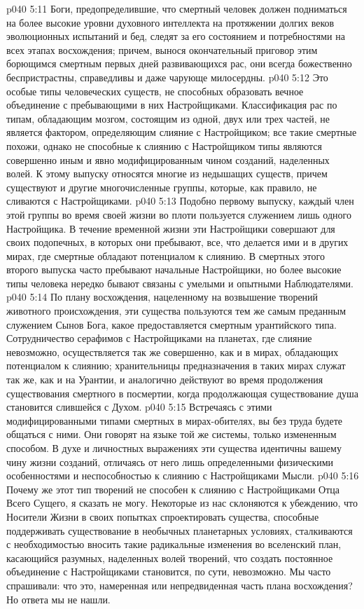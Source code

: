 \vs p040 5:11 \pc Боги, предопределившие, что смертный человек должен подниматься на более высокие уровни духовного интеллекта на протяжении долгих веков эволюционных испытаний и бед, следят за его состоянием и потребностями на всех этапах восхождения; причем, вынося окончательный приговор этим борющимся смертным первых дней развивающихся рас, они всегда божественно беспристрастны, справедливы и даже чарующе милосердны.
\vs p040 5:12 \pc {} Это особые типы человеческих существ, не способных образовать вечное объединение с пребывающими в них Настройщиками. Классификация рас по типам, обладающим мозгом, состоящим из одной, двух или трех частей, не является фактором, определяющим слияние с Настройщиком; все такие смертные похожи, однако не способные к слиянию с Настройщиком типы являются совершенно иным и явно модифицированным чином созданий, наделенных волей. К этому выпуску относятся многие из недышащих существ, причем существуют и другие многочисленные группы, которые, как правило, не сливаются с Настройщиками.
\vs p040 5:13 Подобно первому выпуску, каждый член этой группы во время своей жизни во плоти пользуется служением лишь одного Настройщика. В течение временной жизни эти Настройщики совершают для своих подопечных, в которых они пребывают, все, что делается ими и в других мирах, где смертные обладают потенциалом к слиянию. В смертных этого второго выпуска часто пребывают начальные Настройщики, но более высокие типы человека нередко бывают связаны с умелыми и опытными Наблюдателями.
\vs p040 5:14 По плану восхождения, нацеленному на возвышение творений животного происхождения, эти существа пользуются тем же самым преданным служением Сынов Бога, какое предоставляется смертным урантийского типа. Сотрудничество серафимов с Настройщиками на планетах, где слияние невозможно, осуществляется так же совершенно, как и в мирах, обладающих потенциалом к слиянию; хранительницы предназначения в таких мирах служат так же, как и на Урантии, и аналогично действуют во время продолжения существования смертного в посмертии, когда продолжающая существование душа становится слившейся с Духом.
\vs p040 5:15 Встречаясь с этими модифицированными типами смертных в мирах\hyp{}обителях, вы без труда будете общаться с ними. Они говорят на языке той же системы, только измененным способом. В духе и личностных выражениях эти существа идентичны вашему чину жизни созданий, отличаясь от него лишь определенными физическими особенностями и неспособностью к слиянию с Настройщиками Мысли.
\vs p040 5:16 Почему же этот тип творений не способен к слиянию с Настройщиками Отца Всего Сущего, я сказать не могу. Некоторые из нас склоняются к убеждению, что Носители Жизни в своих попытках спроектировать существа, способные поддерживать существование в необычных планетарных условиях, сталкиваются с необходимостью вносить такие радикальные изменения во вселенский план, касающийся разумных, наделенных волей творений, что создать постоянное объединение с Настройщиками становится, по сути, невозможно. Мы часто спрашивали: что это, намеренная или непредвиденная часть плана восхождения? Но ответа мы не нашли.
